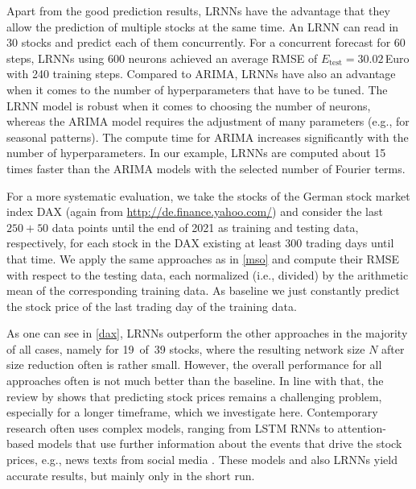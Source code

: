 \documentclass[twoside,11pt]{article}
\theoremstyle{definition}
\newcommand{\euro}{Euro}
\begin{document}
Apart from the good prediction results, LRNNs have the advantage that they allow
the prediction of multiple stocks at the same time. An LRNN can read in 30
stocks and predict each of them concurrently. For a concurrent forecast for 60
steps, LRNNs using 600 neurons achieved an average RMSE of
$E_\mathrm{test}=30.02${\,\euro} with 240 training steps. Compared to ARIMA,
LRNNs have also an advantage when it comes to the number of hyperparameters that
have to be tuned. The LRNN model is robust when it comes to choosing the number
of neurons, whereas the ARIMA model requires the adjustment of many parameters
(e.g., for seasonal patterns). The compute time for ARIMA increases
significantly with the number of hyperparameters. In our example, LRNNs are
computed about 15 times faster than the ARIMA models with the selected number of
Fourier terms.

For a more systematic evaluation, we take the stocks of the German stock market
index DAX (again from \url{http://de.finance.yahoo.com/}) and consider the last
$250+50$ data points until the end of 2021 as training and testing data,
respectively, for each stock in the DAX existing at least $300$ trading days
until that time. We apply the same approaches as in \cref{mso} and compute their
RMSE with respect to the testing data, each normalized (i.e., divided) by the
arithmetic mean of the corresponding training data. As baseline we just
constantly predict the stock price of the last trading day of the training data.

As one can see in \cref{dax}, LRNNs outperform the other approaches in the
majority of all cases, namely for 19~of~39 stocks, where the resulting network
size $N$ after size reduction often is rather small. However, the overall
performance for all approaches often is not much better than the baseline. In
line with that, the review by \citet{SIZ19} shows that predicting stock prices
remains a challenging problem, especially for a longer timeframe, which we
investigate
here. Contemporary research often uses complex models, ranging from LSTM RNNs
\citep{NPO17,RPV17} to attention-based models that use further information about
the events that drive the stock prices, e.g., news texts from social media
\citep{LL+19}. These models and also LRNNs yield accurate results, but mainly
only in the short run.
\end{document}
